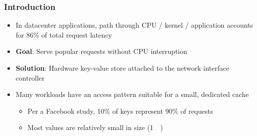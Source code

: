 \frametitle{Introduction}

\begin{itemize}
    \item In datacenter applications, path through CPU / kernel / application
        accounts for 86\% of total request latency
    \item \textbf{Goal}: Serve popular requests without CPU interruption
    \item \textbf{Solution}: Hardware key-value store attached to the network
        interface controller
    \item Many workloads have an access pattern suitable for a small, dedicated cache
        \begin{itemize}
            \item Per a Facebook study, 10\% of keys represent 90\% of requests
            \item Most values are relatively small in size (\SI{1}{\kilo\byte})
        \end{itemize}
\end{itemize}
